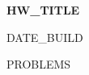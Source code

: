 \documentclass[11pt]{article}
\providecommand{\hwtitle}{HW_TITLE}
\providecommand{\hwdateassign}{DATE_BUILD}
\begin{document}
    \begin{center}
        \Large \textbf{\hwtitle}

        \normalsize \hwdateassign
    \end{center}

PROBLEMS
\end{document}
